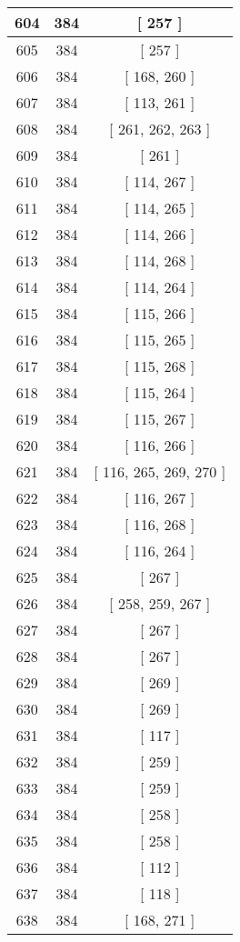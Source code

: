 \begin{center}
\begin{longtable}[H]{|| c c c ||}
\hline
604 & 384 & [ 257 ] \\ 
\hline
605 & 384 & [ 257 ] \\ 
\hline
606 & 384 & [ 168, 260 ] \\ 
\hline
607 & 384 & [ 113, 261 ] \\ 
\hline
608 & 384 & [ 261, 262, 263 ] \\ 
\hline
609 & 384 & [ 261 ] \\ 
\hline
610 & 384 & [ 114, 267 ] \\ 
\hline
611 & 384 & [ 114, 265 ] \\ 
\hline
612 & 384 & [ 114, 266 ] \\ 
\hline
613 & 384 & [ 114, 268 ] \\ 
\hline
614 & 384 & [ 114, 264 ] \\ 
\hline
615 & 384 & [ 115, 266 ] \\ 
\hline
616 & 384 & [ 115, 265 ] \\ 
\hline
617 & 384 & [ 115, 268 ] \\ 
\hline
618 & 384 & [ 115, 264 ] \\ 
\hline
619 & 384 & [ 115, 267 ] \\ 
\hline
620 & 384 & [ 116, 266 ] \\ 
\hline
621 & 384 & [ 116, 265, 269, 270 ] \\ 
\hline
622 & 384 & [ 116, 267 ] \\ 
\hline
623 & 384 & [ 116, 268 ] \\ 
\hline
624 & 384 & [ 116, 264 ] \\ 
\hline
625 & 384 & [ 267 ] \\ 
\hline
626 & 384 & [ 258, 259, 267 ] \\ 
\hline
627 & 384 & [ 267 ] \\ 
\hline
628 & 384 & [ 267 ] \\ 
\hline
629 & 384 & [ 269 ] \\ 
\hline
630 & 384 & [ 269 ] \\ 
\hline
631 & 384 & [ 117 ] \\ 
\hline
632 & 384 & [ 259 ] \\ 
\hline
633 & 384 & [ 259 ] \\ 
\hline
634 & 384 & [ 258 ] \\ 
\hline
635 & 384 & [ 258 ] \\ 
\hline
636 & 384 & [ 112 ] \\ 
\hline
637 & 384 & [ 118 ] \\ 
\hline
638 & 384 & [ 168, 271 ] \\ 

\end{longtable}
\end{center}
